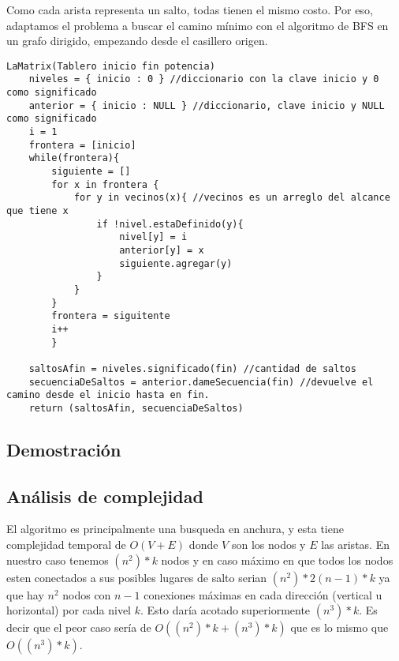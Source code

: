 Como cada arista representa un salto, todas tienen el mismo costo. Por eso, adaptamos el problema a buscar el camino m\'inimo con el algoritmo de BFS en un grafo dirigido, empezando desde el casillero origen.

\begin{verbatim}
LaMatrix(Tablero inicio fin potencia)
    niveles = { inicio : 0 } //diccionario con la clave inicio y 0 como significado
    anterior = { inicio : NULL } //diccionario, clave inicio y NULL como significado
    i = 1
    frontera = [inicio]
    while(frontera){
        siguiente = []
        for x in frontera {
            for y in vecinos(x){ //vecinos es un arreglo del alcance que tiene x
                if !nivel.estaDefinido(y){
                    nivel[y] = i
                    anterior[y] = x
                    siguiente.agregar(y)
                }
            }
        }
        frontera = siguitente
        i++
        }

    saltosAfin = niveles.significado(fin) //cantidad de saltos
    secuenciaDeSaltos = anterior.dameSecuencia(fin) //devuelve el camino desde el inicio hasta en fin.
    return (saltosAfin, secuenciaDeSaltos)
\end{verbatim}


\subsection{Demostraci\'on} 

\subsection{An\'alisis de complejidad}

El algoritmo es principalmente una busqueda en anchura, y esta tiene complejidad temporal de $O(V + E)$ donde $V$ son los nodos y $E$ las aristas.
En nuestro caso tenemos $(n^2)*k$ nodos y en caso m\'aximo en que todos los nodos esten conectados a sus posibles lugares de salto serian $(n^2)*2(n-1)*k$ ya que hay $n^2$ nodos con $n-1$ conexiones m\'aximas en cada direcci\'on (vertical u horizontal) por cada nivel $k$. Esto dar\'ia acotado superiormente $(n^3)*k$.
Es decir que el peor caso ser\'ia de $O((n^2)*k + (n^3)*k)$ que es lo mismo que $O((n^3)*k)$.


